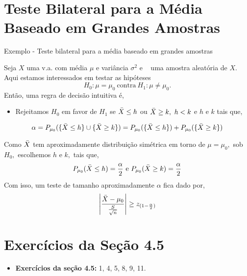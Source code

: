 \documentclass[12pt]{beamer}
\begin{document}
\section{Teste Bilateral para a Média Baseado em Grandes Amostras}
\begin{frame}{Exemplo - Teste bilateral para a média baseado em grandes amostras}
\begin{block}{}
\justifying
Seja $X$ uma v.a. com média $\mu$ e variância $\sigma^{2}$ e \seqX~ uma amostra aleatória de $X.$ Aqui estamos interessados em testar as hipóteses 
\[H_{0}:\mu= \mu_{0}~\text{contra}~H_{1}:\mu\neq\mu_{0}.\]
Então, uma regra de decisão intuitiva é,
\begin{itemize}
    \item Rejeitamos $H_{0}$ em favor de $H_{1}$ se $\Bar{X}\leq h$ ou $\Bar{X}\geq k,~ h<k$ e $h$ e $k$ tais que,
\end{itemize}
\begin{align*}
    \alpha=P_{\mu_{0}}(\{\Bar{X}\leq h\}\cup\{\Bar{X}\geq k\})=P_{\mu_{0}}(\{\Bar{X}\leq h\})+P_{\mu_{0}}(\{\Bar{X}\geq k\})
\end{align*}
\end{block}
\end{frame}

\begin{frame}{}
\begin{block}{}
\justifying
Como $\Bar{X}$ tem aproximadamente distribuição simétrica em torno de $\mu=\mu_{0},$ sob $H_{0},$ escolhemos $h$ e $k,$ tais que,
\begin{align*}
    P_{\mu_{0}}(\Bar{X}\leq h)=\frac{\alpha}{2}~\text{e}~P_{\mu_{0}}(\Bar{X}\geq k)=\frac{\alpha}{2}
\end{align*}
Com isso, um teste de tamanho aproximadamente $\alpha$ fica dado por,
\begin{align*}
    \left|\dfrac{\Bar{X}-\mu_{0}}{\frac{S}{\sqrt{n}}}\right|\geq z_{(1-\frac{\alpha}{2})}
\end{align*}
\end{block}
\end{frame}

\section{Exercícios da Seção 4.5}
\begin{frame}{\Home}
\begin{block}{}
\justifying

\begin{itemize}
    \item \textbf{Exercícios da seção 4.5:} 1, 4, 5, 8, 9, 11.
\end{itemize}
\nocite{hogg}
\end{block}
\end{frame}
\end{document}
